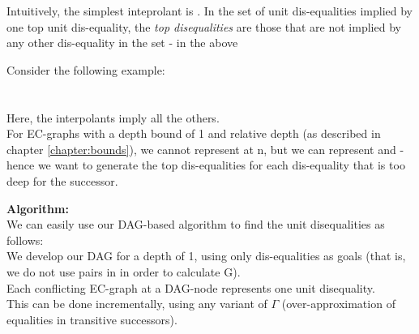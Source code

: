 Intuitively, the simplest inteprolant is .
In the set of unit dis-equalities implied by one top unit dis-equality, 
the \emph{top disequalities} are those that are not implied by any other dis-equality in the set - in the above \\

Consider the following example:\\
\\
\\
Here, the interpolants  imply all the others.\\
For EC-graphs with a depth bound of 1 and relative depth (as described in chapter \ref{chapter:bounds}), 
we cannot represent  at n, but we can represent  and  - 
hence we want to generate the top dis-equalities for each dis-equality that is too deep for the successor.

\textbf{Algorithm:}\\
We can easily use our DAG-based algorithm to find the unit disequalities as follows:\\
We develop our DAG for a depth of 1, using only dis-equalities as goals (that is, we do not use pairs in  in order to calculate G).\\
Each conflicting EC-graph at a DAG-node represents one unit disequality.\\
This can be done incrementally, using any variant of $\Gamma$ (over-approximation of equalities in transitive successors).


